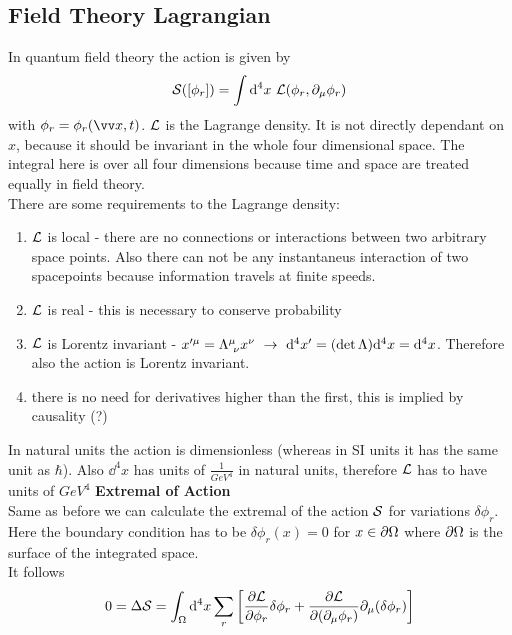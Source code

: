\subsection{Field Theory Lagrangian}
In quantum field theory the action is given by
\[ \mathcal{S}([\phi_r]) = \int {\rm d} ^4 x~\mathcal{L}(\phi_r, \partial_\mu \phi_r)\]
with $\phi_r = \phi_r(\vx, t)$. $\mathcal{L}$ is the Lagrange density. It is not directly dependant on $x$, because it should be invariant in the whole four dimensional space. The integral here is over all four dimensions because time and space are treated equally in field theory.\\
There are some requirements to the Lagrange density:
\begin{enumerate}
\item $\mathcal{L}$ is local - there are no connections or interactions between two arbitrary space points. Also there can not be any instantaneus interaction of two spacepoints because information travels at finite speeds.
\item $\mathcal{L}$ is real - this is necessary to conserve probability
\item $\mathcal{L}$ is Lorentz invariant - $x'^\mu = \Lambda^\mu_{~\nu}x^\nu ~\rightarrow~ {\rm d}^4 x' = (\det \Lambda) {\rm d}^4 x = {\rm d} ^4 x$. Therefore also the action is Lorentz invariant.
\item there is no need for derivatives higher than the first, this is implied by causality (?)
\end{enumerate}
In natural units the action is dimensionless (whereas in SI units it has the same unit as $\hbar$). Also $\dd^4 x$ has units of $\si{\frac{1}{GeV^4}}$ in natural units, therefore $\mathcal{L}$ has to have units of $\si{GeV}^4$
\newline\newline
\textbf{Extremal of Action}\\
Same as before we can calculate the extremal of the action $\mathcal{S}$ for variations $\delta \phi_r$. Here the boundary condition has to be $\delta \phi_r(x) = 0$ for $x \in \partial \Omega$ where $\partial \Omega$ is the surface of the integrated space.\\
It follows
\[ 0 = \Delta \mathcal{S} = \int_\Omega {\rm d} ^4 x \sum_r \left[ \frac{\partial \mathcal{L}}{\partial \phi_r} \delta \phi_r + \frac{ \partial \mathcal{L}}{\partial (\partial_\mu \phi_r)} \partial_\mu(\delta \phi_r) \right]\]


